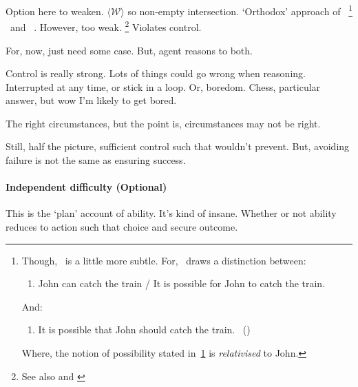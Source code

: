 \begin{note}
  Option here to weaken.
  \(\langle \mathcal{W} \rangle\) so non-empty intersection.
  `Orthodox' approach of~\textcite{Hilpinen:1969vw}%
  \footnote{
    Though,~\citeauthor{Hilpinen:1969vw} is a little more subtle.
    For,~\citeauthor{Hilpinen:1969vw} draws a distinction between:
    \begin{enumerate}[label=(A\(^{/}{'}\)), ref=(A\(^{/}{'}\))]
    \item
      \label{Hilpinen:A}
      John can catch the train / It is possible for John to catch the train.
    \end{enumerate}
    And:
    \begin{enumerate}[label=(C), ref=(C)]
    \item
      \label{Hilpinen:C}
      It is possible that John should catch the train.%
      \mbox{ }\hfill\mbox{(\citeyear[181--182]{Hilpinen:1969vw})}
    \end{enumerate}
    Where, the notion of possibility stated in~\ref{Hilpinen:A} is \emph{relativised} to John.
  }
  \textcite{Kratzer:1977aa,Kratzer:1981vn}~and ~\textcite{Lewis:1976us}.
  However, too weak.%
  \footnote{
    See also \textcite[\S1.3]{Boylan:2020aa} and \textcite[\S2]{Mandelkern:2017aa}
  }
  Violates control.


  For, now, just need some case.
  But, agent reasons to both.
\end{note}

\begin{note}
  Control is really strong.
  Lots of things could go wrong when reasoning.
  Interrupted at any time, or stick in a loop.
  Or, boredom.
  Chess, particular answer, but wow I'm likely to get bored.

  The right circumstances, but the point is, circumstances may not be right.

  Still, half the picture, sufficient control such that wouldn't prevent.
  But, avoiding failure is not the same as ensuring success.
\end{note}

\paragraph[Independent difficulty]{Independent difficulty \hfill (Optional)}

\begin{note}
  This is the `plan' account of ability.
  It's kind of insane.
  Whether or not ability reduces to action such that choice and secure outcome.
\end{note}

